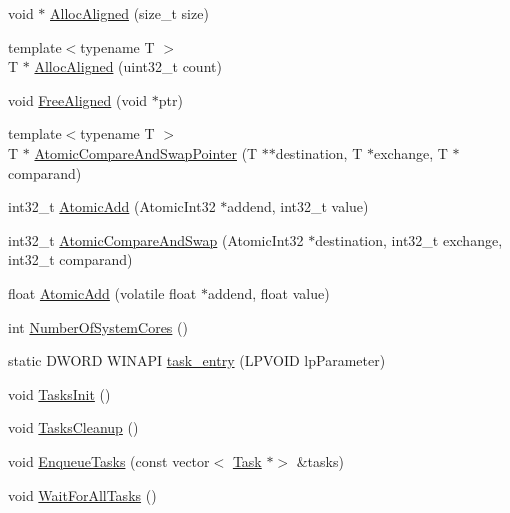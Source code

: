 \begin{DoxyCompactItemize}
void $\ast$ \hyperlink{namespacemage_a7d706913bb9fb322c938cd3e4d8eaede}{Alloc\+Aligned} (size\+\_\+t size)
\item 
{\footnotesize template$<$typename T $>$ }\\T $\ast$ \hyperlink{namespacemage_ae2f31ba64620694aa0dfc8ca6e5d5941}{Alloc\+Aligned} (uint32\+\_\+t count)
\item 
void \hyperlink{namespacemage_a401c54df21447c491c527735647b5f80}{Free\+Aligned} (void $\ast$ptr)
\item 
{\footnotesize template$<$typename T $>$ }\\T $\ast$ \hyperlink{namespacemage_aed89242e67231f3ddef77bdc63b32b6c}{Atomic\+Compare\+And\+Swap\+Pointer} (T $\ast$$\ast$destination, T $\ast$exchange, T $\ast$comparand)
\item 
int32\+\_\+t \hyperlink{namespacemage_ad397e742fa7e3532686fd46bb50e8166}{Atomic\+Add} (Atomic\+Int32 $\ast$addend, int32\+\_\+t value)
\item 
int32\+\_\+t \hyperlink{namespacemage_a03da57cfa5ba14d4aa0472ae49ec5c7e}{Atomic\+Compare\+And\+Swap} (Atomic\+Int32 $\ast$destination, int32\+\_\+t exchange, int32\+\_\+t comparand)
\item 
float \hyperlink{namespacemage_a0de5ff6241a0474f4572c7c3ba342098}{Atomic\+Add} (volatile float $\ast$addend, float value)
\item 
int \hyperlink{namespacemage_ab972a47121b68775bf2545b826a1d5be}{Number\+Of\+System\+Cores} ()
\item 
static D\+W\+O\+RD W\+I\+N\+A\+PI \hyperlink{namespacemage_a1f113843a26e671776ec469adf7ccc51}{task\+\_\+entry} (L\+P\+V\+O\+ID lp\+Parameter)
\item 
void \hyperlink{namespacemage_a8252f7acebefd3efe34a15cc51e4a7ac}{Tasks\+Init} ()
\item 
void \hyperlink{namespacemage_a118ddaa5d9606328a0af412c85832e6b}{Tasks\+Cleanup} ()
\item 
void \hyperlink{namespacemage_a0f0fa32534696afa66b313ffebbf9caf}{Enqueue\+Tasks} (const vector$<$ \hyperlink{classmage_1_1_task}{Task} $\ast$$>$ \&tasks)
\item 
void \hyperlink{namespacemage_a7da78c39175a029c92ed42d8fb9f30af}{Wait\+For\+All\+Tasks} ()
\end{DoxyCompactItemize}
